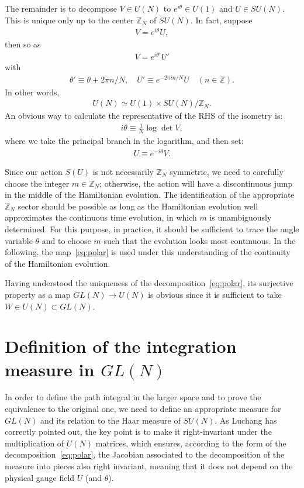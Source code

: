 \documentclass[12pt]{article}
\begin{document}
The remainder is to decompose $V \in U(N)$
to $e^{i\theta} \in U(1)$ and $U \in SU(N)$.
This is unique only up to the center $\mathbb{Z}_{N}$ of $SU(N)$.
In fact, suppose
\begin{align}
  V = e^{i \theta} U,
\end{align}
then so as
\begin{align}
  V = e^{i \theta'} U'
\end{align}
with
\begin{align}
  \theta' \equiv \theta + 2\pi n/N,
  \quad
  U' \equiv e^{-2\pi i n/N} U
  \quad (n \in \mathbb{Z}).
\end{align}
In other words,
\begin{align}
  U(N) \simeq U(1) \times SU(N) / \mathbb{Z}_{N}.
\end{align}
An obvious way to calculate the representative of the RHS of the isometry is:
\begin{align}
  i\theta \equiv \frac{1}{N} \log \det V,
\end{align}
where we take the principal branch in the logarithm,
and then set:
\begin{align}
  U \equiv e^{-i\theta} V.
\end{align}

Since our action $S(U)$ is not necessarily $\mathbb{Z}_{N}$ symmetric,
we need to carefully choose the integer $m \in \mathbb{Z}_{N}$;
otherwise, the action will have a discontinuous jump in the middle of
the Hamiltonian evolution.
The identification of the appropriate $\mathbb{Z}_{N}$ sector
should be possible as long as
the Hamiltonian evolution well approximates the continuous time evolution,
in which $m$ is unambiguously determined.
For this purpose, in practice, it should be sufficient to trace
the angle variable $\theta$
and to choose $m$ such that the evolution looks most continuous.
In the following, the map~\eqref{eq:polar}
is used under this understanding of the continuity of the Hamiltonian evolution.

Having understood the uniqueness of the decomposition~\eqref{eq:polar},
its surjective property as a map $GL(N) \to U(N)$ is obvious
since it is sufficient to take $W \in U(N) \subset GL(N)$.


\section{Definition of the integration measure in $GL(N)$}
\label{sec:measure}

In order to define the path integral in the larger space
and to prove the equivalence to the original one,
we need to define an appropriate measure for $GL(N)$
and its relation to the Haar measure of $SU(N)$.
As Luchang has correctly pointed out,
the key point is to make it right-invariant under
the multiplication of $U(N)$ matrices,
which ensures, according to the form of the decomposition~\eqref{eq:polar},
the Jacobian associated to
the decomposition of the measure into pieces also right invariant,
meaning that it does not depend on the physical gauge field $U$ (and $\theta$).
\end{document}
